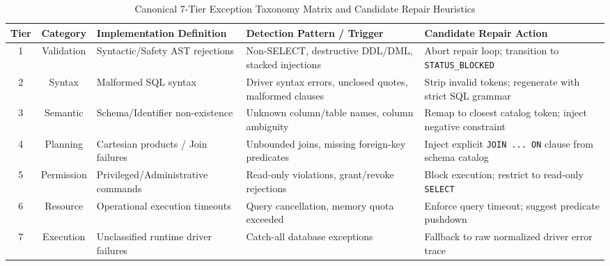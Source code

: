 \begin{table}[t]
\centering
\caption{Canonical 7-Tier Exception Taxonomy Matrix and Candidate Repair Heuristics}
\label{tab:taxonomy}
\begin{tabular}{ccllp{5.5cm}}
\hline
\textbf{Tier} & \textbf{Category} & \textbf{Implementation Definition} & \textbf{Detection Pattern / Trigger} & \textbf{Candidate Repair Action} \\
\hline
1 & Validation & Syntactic/Safety AST rejections & Non-SELECT, destructive DDL/DML, stacked injections & Abort repair loop; transition to \texttt{STATUS\_BLOCKED} \\
2 & Syntax & Malformed SQL syntax & Driver syntax errors, unclosed quotes, malformed clauses & Strip invalid tokens; regenerate with strict SQL grammar \\
3 & Semantic & Schema/Identifier non-existence & Unknown column/table names, column ambiguity & Remap to closest catalog token; inject negative constraint \\
4 & Planning & Cartesian products / Join failures & Unbounded joins, missing foreign-key predicates & Inject explicit \texttt{JOIN ... ON} clause from schema catalog \\
5 & Permission & Privileged/Administrative commands & Read-only violations, grant/revoke rejections & Block execution; restrict to read-only \texttt{SELECT} \\
6 & Resource & Operational execution timeouts & Query cancellation, memory quota exceeded & Enforce query timeout; suggest predicate pushdown \\
7 & Execution & Unclassified runtime driver failures & Catch-all database exceptions & Fallback to raw normalized driver error trace \\
\hline
\end{tabular}
\end{table}
